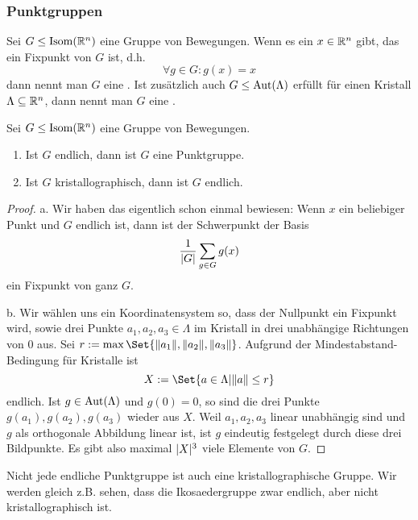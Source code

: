 
\subsubsection{Punktgruppen}

\begin{definition}[Punktgruppen]
Sei $G\leq\operatorname{Isom}(\mathbb{R}^n)$ eine Gruppe von Bewegungen. Wenn es ein $x\in\mathbb{R}^n$ gibt, das ein Fixpunkt von $G$ ist, d.h.
\[\forall g\in G: g(x)=x\]
dann nennt man $G$ eine . Ist zusätzlich auch $G\leq\operatorname{Aut}(\Lambda)$ erfüllt für einen Kristall $\Lambda\subseteq\mathbb{R}^n$, dann nennt man $G$ eine .
\end{definition}

\begin{lemma}
Sei $G\leq\operatorname{Isom}(\mathbb{R}^n)$ eine Gruppe von Bewegungen.
\begin{enumerate}
\item Ist $G$ endlich, dann ist $G$ eine Punktgruppe.
\item Ist $G$ kristallographisch, dann ist $G$ endlich.
\end{enumerate}
\end{lemma}
\begin{proof}
a. Wir haben das eigentlich schon einmal bewiesen: Wenn $x$ ein beliebiger Punkt und $G$ endlich ist, dann ist der Schwerpunkt der Basis
\[\frac{1}{\lvert G\rvert} \sum_{g\in G} g(x)\]
ein Fixpunkt von ganz $G$.

\medbreak
b. Wir wählen uns ein Koordinatensystem so, dass der Nullpunkt ein Fixpunkt wird, sowie drei Punkte $a_1,a_2,a_3\in\Lambda$ im Kristall in drei unabhängige Richtungen von $0$ aus. Sei $r:=\max\Set{\norm{a_1},\norm{a_2},\norm{a_3}}$. Aufgrund der Mindestabstand-Bedingung für Kristalle ist
\[X:=\Set{a\in\Lambda | \norm{a}\leq r}\]
endlich. Ist $g\in\operatorname{Aut}(\Lambda)$ und $g(0)=0$, so sind die drei Punkte $g(a_1),g(a_2),g(a_3)$ wieder aus $X$. Weil $a_1,a_2,a_3$ linear unabhängig sind und $g$ als orthogonale Abbildung linear ist, ist $g$ eindeutig festgelegt durch diese drei Bildpunkte. Es gibt also maximal $\lvert X\rvert^3$ viele Elemente von $G$.
\end{proof}

\begin{remark}
Nicht jede endliche Punktgruppe ist auch eine kristallographische Gruppe. Wir werden gleich z.B. sehen, dass die Ikosaedergruppe zwar endlich, aber nicht kristallographisch ist.
\end{remark}

